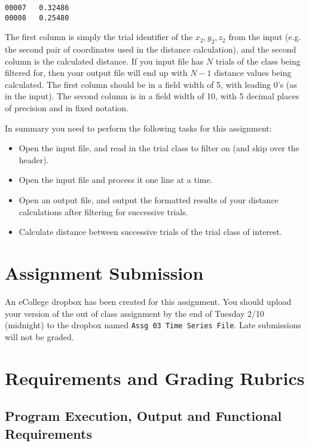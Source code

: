 \documentclass[11pt]{article}
\begin{document}
\begin{verbatim}
00007   0.32486
00008   0.25480
\end{verbatim}

The first column is simply the trial identifier of the $x_2, y_2, z_2$
from the input (e.g.  the second pair of coordinates used in the
distance calculation), and the second column is the calculated
distance.  If you input file has $N$ trials of the class being
filtered for, then your output file will end up with $N-1$ distance
values being calculated.  The first column should be in a field width
of 5, with leading 0's (as in the input).  The second column is in a
field width of 10, with 5 decimal places of precision and in fixed
notation.

In summary you need to perform the following tasks for this assignment:

\begin{itemize}
\item Open the input file, and read in the trial class to filter on (and
skip over the header).
\item Open the input file and process it one line at a time.
\item Open an output file, and output the formatted results of your
distance calculations after filtering for successive trials.
\item Calculate distance between successive trials of the trial class
of interest.
\end{itemize}
\section*{Assignment Submission}
\label{sec-4}

An eCollege dropbox has been created for this assignment.  You should
upload your version of the out of class assignment by the end of
Tuesday 2/10 (midnight) to the dropbox named \verb~Assg 03 Time Series File~.
Late submissions will not be graded.
\section*{Requirements and Grading Rubrics}
\label{sec-5}

\subsection*{Program Execution, Output and Functional Requirements}
\label{sec-5-1}
\end{document}
